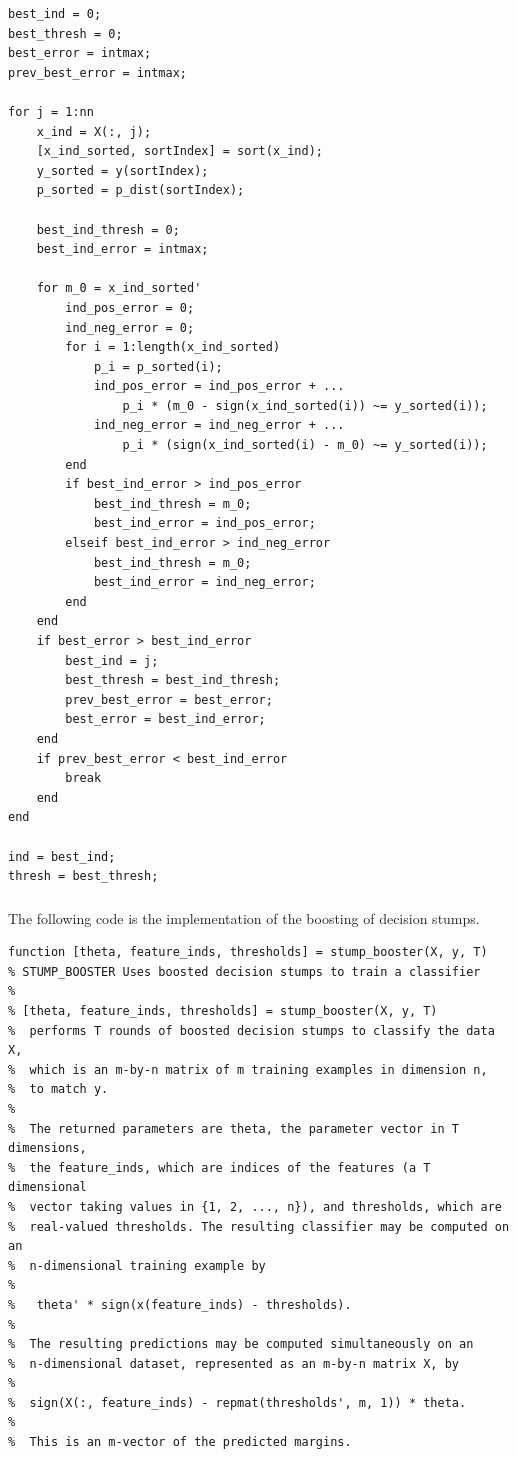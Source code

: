 \documentclass[11pt,a4paper,titlepage]{article}
\begin{document}
{{{\begin{verbatim}
best_ind = 0;
best_thresh = 0;
best_error = intmax;
prev_best_error = intmax;

for j = 1:nn
    x_ind = X(:, j);
    [x_ind_sorted, sortIndex] = sort(x_ind);
    y_sorted = y(sortIndex);
    p_sorted = p_dist(sortIndex);
    
    best_ind_thresh = 0;
    best_ind_error = intmax;
    
    for m_0 = x_ind_sorted'
        ind_pos_error = 0;
        ind_neg_error = 0;
        for i = 1:length(x_ind_sorted)
            p_i = p_sorted(i);
            ind_pos_error = ind_pos_error + ...
                p_i * (m_0 - sign(x_ind_sorted(i)) ~= y_sorted(i));
            ind_neg_error = ind_neg_error + ...
                p_i * (sign(x_ind_sorted(i) - m_0) ~= y_sorted(i));
        end
        if best_ind_error > ind_pos_error
            best_ind_thresh = m_0;
            best_ind_error = ind_pos_error;
        elseif best_ind_error > ind_neg_error
            best_ind_thresh = m_0;
            best_ind_error = ind_neg_error;
        end
    end
    if best_error > best_ind_error
        best_ind = j;
        best_thresh = best_ind_thresh;
        prev_best_error = best_error;
        best_error = best_ind_error;
    end
    if prev_best_error < best_ind_error
        break
    end
end

ind = best_ind;
thresh = best_thresh;
\end{verbatim}
}\label{prob:6d1}
\subsubsection{}{
\quad The following code is the implementation of the boosting of decision stumps.
\begin{verbatim}
function [theta, feature_inds, thresholds] = stump_booster(X, y, T)
% STUMP_BOOSTER Uses boosted decision stumps to train a classifier
%
% [theta, feature_inds, thresholds] = stump_booster(X, y, T)
%  performs T rounds of boosted decision stumps to classify the data X,
%  which is an m-by-n matrix of m training examples in dimension n,
%  to match y.
%
%  The returned parameters are theta, the parameter vector in T dimensions,
%  the feature_inds, which are indices of the features (a T dimensional
%  vector taking values in {1, 2, ..., n}), and thresholds, which are
%  real-valued thresholds. The resulting classifier may be computed on an
%  n-dimensional training example by
%
%   theta' * sign(x(feature_inds) - thresholds).
%
%  The resulting predictions may be computed simultaneously on an
%  n-dimensional dataset, represented as an m-by-n matrix X, by
%
%  sign(X(:, feature_inds) - repmat(thresholds', m, 1)) * theta.
%
%  This is an m-vector of the predicted margins.


\end{verbatim}}}}
\end{document}
